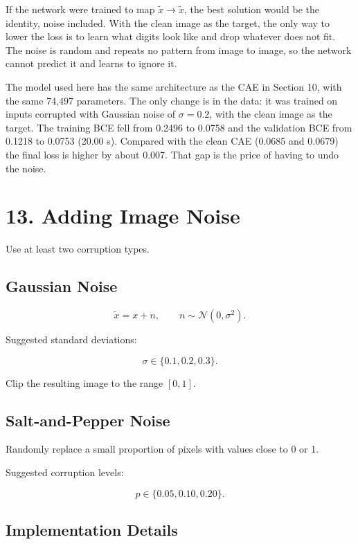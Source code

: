 \documentclass[10pt]{article}
\begin{document}
If the network were trained to map $\tilde{x}\rightarrow\tilde{x}$, the best solution
would be the identity, noise included. With the clean image as the target, the
only way to lower the loss is to learn what digits look like and drop whatever
does not fit. The noise is random and repeats no pattern from image to image, so
the network cannot predict it and learns to ignore it.

The model used here has the same architecture as the CAE in Section 10, with
the same 74,497 parameters. The only change is in the data: it was trained on
inputs corrupted with Gaussian noise of $\sigma=0.2$, with the clean image as
the target. The training BCE fell from 0.2496 to 0.0758 and the validation BCE
from 0.1218 to 0.0753 (20.00 s). Compared with the clean CAE (0.0685 and 0.0679)
the final loss is higher by about 0.007. That gap is the price of having to
undo the noise.

\section*{13. Adding Image Noise}

Use at least two corruption types.

\subsection*{Gaussian Noise}

\[
\tilde{x}=x+n,
\qquad
n\sim\mathcal{N}(0,\sigma^2).
\]

Suggested standard deviations:

\[
\sigma\in\{0.1,0.2,0.3\}.
\]

Clip the resulting image to the range $[0,1]$.

\subsection*{Salt-and-Pepper Noise}

Randomly replace a small proportion of pixels with values close to 0 or 1.

Suggested corruption levels:

\[
p\in\{0.05,0.10,0.20\}.
\]

\subsection*{Implementation Details}
\end{document}
